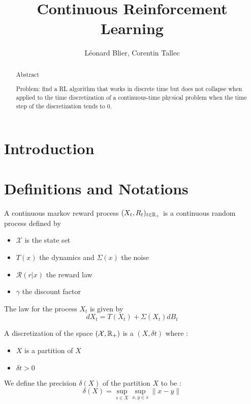 \documentclass{article}
\title{Continuous Reinforcement Learning}
\author{L\'eonard Blier, Corentin Tallec}
\begin{document}
\maketitle


\begin{abstract}
Abstract

Problem: find a RL algorithm that works in discrete time but does not
collapse when applied to the time discretization of a continuous-time
physical problem when the time step of the discretization tends to $0$.
\end{abstract}

\section{Introduction}
\label{sec:introduction}


\section{Definitions and Notations}
\label{sec:definitions}

\begin{definition}
  A continuous markov reward process $(X_{t}, R_{t})_{t\in\mathbb{R}_{+}}$ is a continuous random process defined by 
  \begin{itemize}
  \item $\mathcal{X}$ is the state set 
  \item $T(x)$ the dynamics and $\Sigma (x)$ the noise
  \item $\mathcal{R}(r|x)$ the reward law
  \item $\gamma$ the discount factor
  \end{itemize}
  The law for the process $X_{t}$ is given by
  \begin{equation}
    \label{eq:eqdiffstoch}
    dX_{t} = T(X_{t}) + \Sigma(X_{t})dB_{t}
  \end{equation}
\end{definition}


\begin{definition}
  A discretization of the space $(\mathcal{X}, \mathbb{R}_{+})$ is a $(X, \delta t)$ where :
  \begin{itemize}
  \item $X$ is a partition of $X$
  \item $\delta t > 0$
  \end{itemize}
  We define the precision $\delta(X)$ of the partition $X$ to be :
  \begin{equation}
    \label{eq:2}
    \delta(X) = \sup_{s\in X}\sup_{x,y \in s}\|x-y\|
  \end{equation}
\end{definition}
\end{document}
